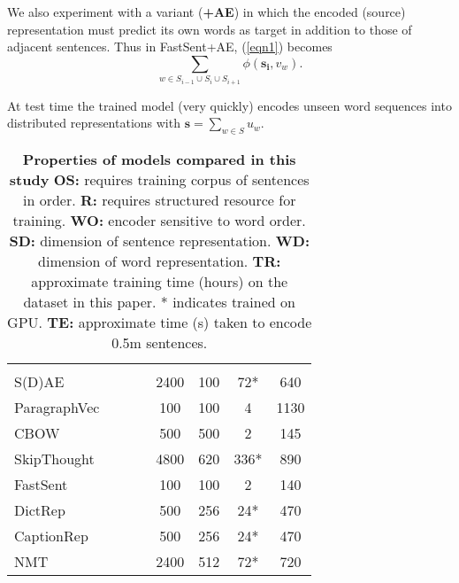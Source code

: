 \documentclass[11pt,letterpaper]{article}
\newcommand*\rot{\rotatebox{90}}
\newcommand*\OK{\ding{51}}
\begin{document}
We also experiment with a variant ({\bf+AE}) in which the encoded (source) representation must predict its own words as target in addition to those of adjacent sentences. Thus in FastSent+AE, (\ref{eqn1}) becomes  \begin{equation} 
\sum_{w \in S_{i-1} \cup S_{i} \cup S_{i+1}} \phi(\mathbf{s_i},v_w).
\end{equation}

\noindent At test time the trained model (very quickly) encodes unseen word sequences into distributed representations with \( \mathbf{s} = \sum_{w \in S} u_w \).

\begin{table}

  \small
    \begin{tabular}{l|ccccccc}\\
         & \rot{OS} & \rot{R} & \rot{WO} & \rot{SD} & \rot{WD}
        & \rot{TR} & \rot{TE} \\
        \cmidrule{1-8}
        S(D)AE              & & & \OK  & 2400 & 100 & 72* &  640 \\
        ParagraphVec &  & &   & 100 & 100&  4 & 1130  \\
        CBOW                &&  &   &  500 & 500 &  2 & 145  \\
        SkipThought             & \OK &  & \OK  & 4800 & 620 & 336* & 890  \\
        FastSent               & \OK &  & & 100 & 100 & 2  & 140  \\
        DictRep                & &  \OK & \OK  & 500 & 256 & 24* & 470  \\
        CaptionRep                & & \OK  & \OK  & 500 &  256 & 24* & 470  \\
        NMT                & & \OK & \OK  &  2400 & 512 &  72* & 720  \\
        \cmidrule[1pt]{1-8}
    \end{tabular}
    \caption{\label{modelprops} {\bf Properties of models compared in this study} \hspace{6mm} {\bf OS:} requires training corpus of sentences in order. {\bf R:} requires structured resource for training. {\bf WO:} encoder sensitive to word order. {\bf SD:} dimension of sentence representation. {\bf WD:} dimension of word representation. {\bf TR:} approximate training time (hours) on the dataset in this paper. * indicates trained on GPU. {\bf TE:} approximate time (s) taken to encode 0.5m sentences.}

\end{table}
\end{document}
